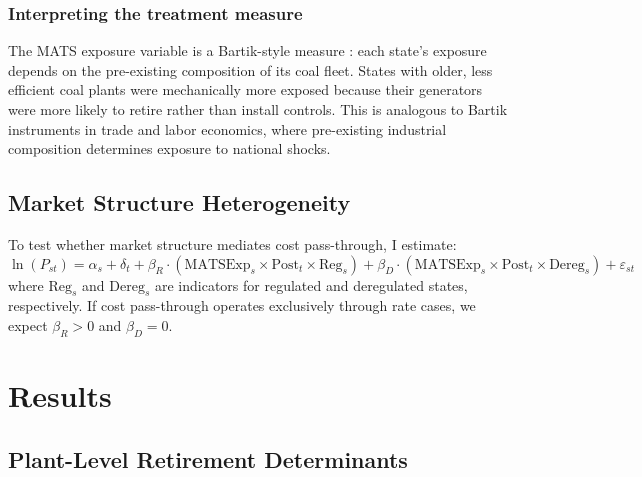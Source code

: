 \documentclass[12pt]{article}
\begin{document}
\subsubsection*{Interpreting the treatment measure} The MATS exposure variable is a Bartik-style measure \citep{bartik1991benefits, goldsmith2020bartik}: each state's exposure depends on the pre-existing composition of its coal fleet. States with older, less efficient coal plants were mechanically more exposed because their generators were more likely to retire rather than install controls. This is analogous to Bartik instruments in trade \citep{autor2013china} and labor economics, where pre-existing industrial composition determines exposure to national shocks.

\subsection{Market Structure Heterogeneity}

To test whether market structure mediates cost pass-through, I estimate:
\begin{equation}
\ln(P_{st}) = \alpha_s + \delta_t + \beta_R \cdot (\text{MATSExp}_s \times \text{Post}_t \times \text{Reg}_s) + \beta_D \cdot (\text{MATSExp}_s \times \text{Post}_t \times \text{Dereg}_s) + \varepsilon_{st}
\end{equation}
where $\text{Reg}_s$ and $\text{Dereg}_s$ are indicators for regulated and deregulated states, respectively. If cost pass-through operates exclusively through rate cases, we expect $\beta_R > 0$ and $\beta_D = 0$.


\section{Results}

\subsection{Plant-Level Retirement Determinants}
\end{document}
